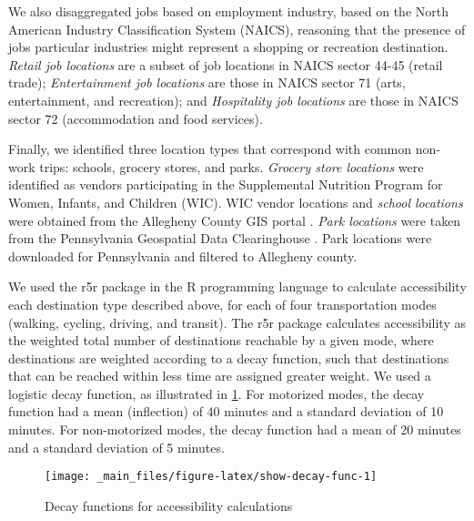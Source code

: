 \documentclass[
]{book}
\theoremstyle{definition}
\theoremstyle{definition}
\theoremstyle{definition}
\theoremstyle{definition}
\theoremstyle{remark}
\begin{document}
We also disaggregated jobs based on employment industry, based on the North
American Industry Classification System (NAICS), reasoning that the presence of
jobs particular industries might represent a shopping or recreation destination.
\emph{Retail job locations} are a subset of job locations in NAICS sector 44-45
(retail trade); \emph{Entertainment job locations} are those in NAICS sector 71
(arts, entertainment, and recreation); and \emph{Hospitality job locations} are
those in NAICS sector 72 (accommodation and food services).

Finally, we identified three location types that correspond with common non-work
trips: schools, grocery stores, and parks. \emph{Grocery store locations} were
identified as vendors participating in the Supplemental Nutrition Program for
Women, Infants, and Children (WIC). WIC vendor locations and \emph{school locations}
were obtained from the Allegheny County GIS portal
\citep{allegheny_county_office_of_information_technology_allegheny_2018, allegheny_county_office_of_information_technology_allegheny_2020}.
\emph{Park locations} were taken from the Pennsylvania Geospatial Data Clearinghouse
\citep{pennsylvania_department_of_conservation_and_natural_resources_pennsylvania_2015}.
Park locations were downloaded for Pennsylvania and filtered to Allegheny county.

We used the r5r package in the R programming language \citep{pereira_r5r_2021} to
calculate accessibility each destination type described above,
for each of four transportation modes (walking, cycling, driving, and transit).
The r5r package calculates accessibility as the weighted total number of
destinations reachable by a given mode, where destinations are weighted
according to a decay function, such that destinations that can be reached within
less time are assigned greater weight. We used a logistic decay function, as
illustrated in \ref{fig:show-decay-func}. For motorized modes, the decay
function had a mean (inflection) of 40 minutes and a standard deviation of 10
minutes. For non-motorized modes, the decay function had a mean of 20 minutes
and a standard deviation of 5 minutes.

\begin{figure}

{\centering \texttt{[image: \_main\_files/figure-latex/show-decay-func-1]} 

}

\caption{Decay functions for accessibility calculations}\label{fig:show-decay-func}
\end{figure}
\end{document}
